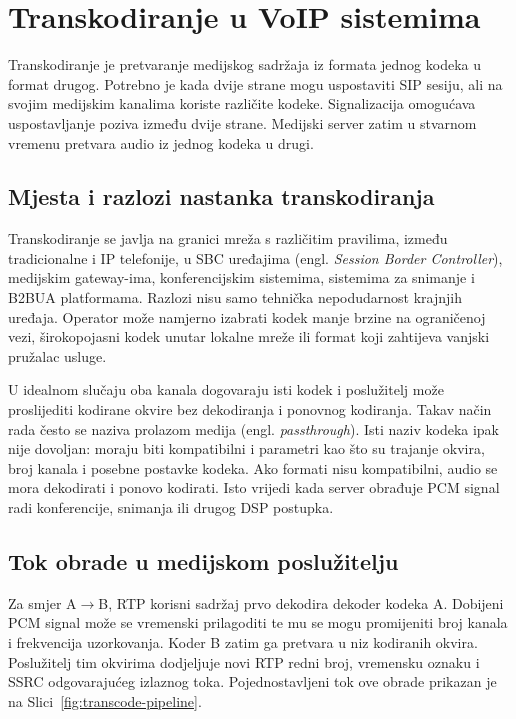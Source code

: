\chapter{Transkodiranje u VoIP sistemima}
\label{ch:transkodiranje}

Transkodiranje je pretvaranje medijskog sadržaja iz formata jednog kodeka u format drugog. Potrebno je kada dvije strane mogu uspostaviti SIP sesiju, ali na svojim medijskim kanalima koriste različite kodeke. Signalizacija omogućava uspostavljanje poziva između dvije strane. Medijski server zatim u stvarnom vremenu pretvara audio iz jednog kodeka u drugi.

\section{Mjesta i razlozi nastanka transkodiranja}

Transkodiranje se javlja na granici mreža s različitim pravilima, između tradicionalne i IP telefonije, u SBC uređajima (engl. \emph{Session Border Controller}), medijskim gateway-ima, konferencijskim sistemima, sistemima za snimanje i B2BUA platformama. Razlozi nisu samo tehnička nepodudarnost krajnjih uređaja. Operator može namjerno izabrati kodek manje brzine na ograničenoj vezi, širokopojasni kodek unutar lokalne mreže ili format koji zahtijeva vanjski pružalac usluge.

U idealnom slučaju oba kanala dogovaraju isti kodek i poslužitelj može proslijediti kodirane okvire bez dekodiranja i ponovnog kodiranja. Takav način rada često se naziva prolazom medija (engl. \emph{passthrough}). Isti naziv kodeka ipak nije dovoljan: moraju biti kompatibilni i parametri kao što su trajanje okvira, broj kanala i posebne postavke kodeka. Ako formati nisu kompatibilni, audio se mora dekodirati i ponovo kodirati. Isto vrijedi kada server obrađuje PCM signal radi konferencije, snimanja ili drugog DSP postupka.

\section{Tok obrade u medijskom poslužitelju}

Za smjer A$\rightarrow$B, RTP korisni sadržaj prvo dekodira dekoder kodeka A. Dobijeni PCM signal može se vremenski prilagoditi te mu se mogu promijeniti broj kanala i frekvencija uzorkovanja. Koder B zatim ga pretvara u niz kodiranih okvira. Poslužitelj tim okvirima dodjeljuje novi RTP redni broj, vremensku oznaku i SSRC odgovarajućeg izlaznog toka. Pojednostavljeni tok ove obrade prikazan je na Slici~\ref{fig:transcode-pipeline}.

